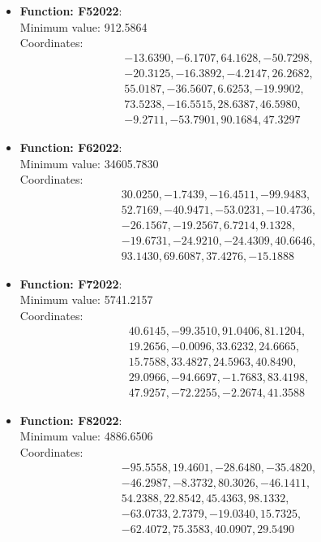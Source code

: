 \documentclass{article}
\begin{document}
\begin{itemize}
  \item \textbf{Function: F52022}: \\
    Minimum value: 912.5864 \\
    Coordinates:
    \[
      \begin{aligned}
        & -13.6390, -6.1707, 64.1628, -50.7298, \\
        & -20.3125, -16.3892, -4.2147, 26.2682, \\
        & 55.0187, -36.5607, 6.6253, -19.9902, \\
        & 73.5238, -16.5515, 28.6387, 46.5980, \\
        & -9.2711, -53.7901, 90.1684, 47.3297
      \end{aligned}
    \]

  \item \textbf{Function: F62022}: \\
    Minimum value: 34605.7830 \\
    Coordinates:
    \[
      \begin{aligned}
        & 30.0250, -1.7439, -16.4511, -99.9483, \\
        & 52.7169, -40.9471, -53.0231, -10.4736, \\
        & -26.1567, -19.2567, 6.7214, 9.1328, \\
        & -19.6731, -24.9210, -24.4309, 40.6646, \\
        & 93.1430, 69.6087, 37.4276, -15.1888
      \end{aligned}
    \]

  \item \textbf{Function: F72022}: \\
    Minimum value: 5741.2157 \\
    Coordinates:
    \[
      \begin{aligned}
        & 40.6145, -99.3510, 91.0406, 81.1204, \\
        & 19.2656, -0.0096, 33.6232, 24.6665, \\
        & 15.7588, 33.4827, 24.5963, 40.8490, \\
        & 29.0966, -94.6697, -1.7683, 83.4198, \\
        & 47.9257, -72.2255, -2.2674, 41.3588
      \end{aligned}
    \]

  \item \textbf{Function: F82022}: \\
    Minimum value: 4886.6506 \\
    Coordinates:
    \[
      \begin{aligned}
        & -95.5558, 19.4601, -28.6480, -35.4820, \\
        & -46.2987, -8.3732, 80.3026, -46.1411, \\
        & 54.2388, 22.8542, 45.4363, 98.1332, \\
        & -63.0733, 2.7379, -19.0340, 15.7325, \\
        & -62.4072, 75.3583, 40.0907, 29.5490
      \end{aligned}
    \]


\end{itemize}
\end{document}
